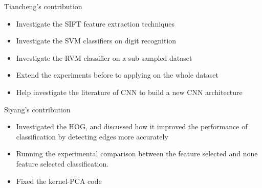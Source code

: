 \documentclass[12pt]{article}
\newenvironment{nscenter}
 {\parskip=0pt\par\nopagebreak\centering}
 {\par\noindent\ignorespacesafterend}
\begin{document}




\newpage
\begin{nscenter}
\Large{Tiancheng's contribution}
\end{nscenter}
\begin{itemize}
\item Investigate the SIFT feature extraction techniques 
\item Investigate the SVM classifiers on digit recognition
\item Investigate the RVM classifier on a sub-sampled dataset
\item Extend the experiments before to applying on the whole dataset
\item Help investigate the literature of CNN to build a new CNN architecture
\end{itemize}

\newpage
\begin{nscenter}
\Large{Siyang's contribution}
\end{nscenter}
\begin{itemize}
\item Investigated the HOG, and discussed how it improved the performance of classification by detecting edges more accurately
\item Running the experimental comparison between the feature selected and none feature selected classification.
\item Fixed the kernel-PCA code
\end{itemize}



\end{document}
